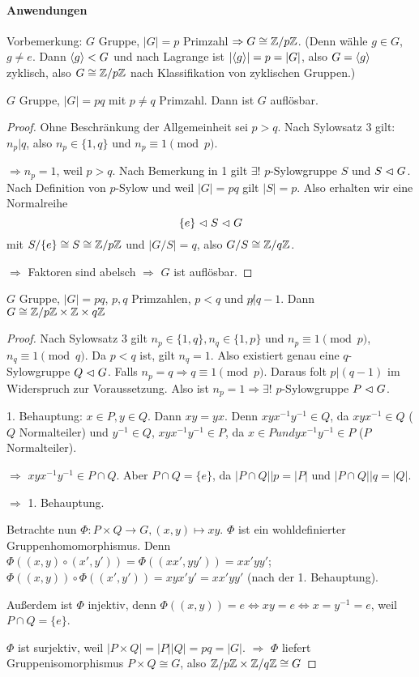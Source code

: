 \documentclass[12pt,a4paper]{scrartcl}
\begin{document}
\paragraph{Anwendungen}\leavevmode
Vorbemerkung: $G$ Gruppe, $|G| = p$ Primzahl $\Rightarrow G\cong \mathbb Z/p\mathbb Z$. (Denn wähle $g\in G$, $g\neq e$. Dann $\langle g\rangle <G$ und nach Lagrange ist $|\langle g\rangle| = p = |G|$, also $G = \langle g\rangle$ zyklisch, also $G\cong \mathbb Z/p\mathbb Z$ nach Klassifikation von zyklischen Gruppen.)
\begin{satz}
	$G$ Gruppe, $|G| = pq$ mit $p\neq q$ Primzahl. Dann ist $G$ auflösbar.
\end{satz}	
\begin{proof}
	Ohne Beschränkung der Allgemeinheit sei $p>q$. Nach Sylowsatz 3 gilt: $n_p|q$, also $n_p\in\{1,q\}$ und $n_p\equiv 1 \pmod p$.
	
	$\Rightarrow n_p = 1$, weil $p>q$. Nach Bemerkung in 1 gilt $\exists!$ $p$-Sylowgruppe $S$ und $S\vartriangleleft G$. Nach Definition von $p$-Sylow und weil $|G| = pq$ gilt $|S| = p$. Also erhalten wir eine Normalreihe 
	$$ \{e\}\vartriangleleft S\vartriangleleft G$$ mit $S/\{e\}\cong S\cong \mathbb Z/p\mathbb Z$ und $|G/S| = q$, also $G/S\cong \mathbb Z/q\mathbb Z$.
	
	$\Rightarrow$ Faktoren sind abelsch $\Rightarrow$ $G$ ist auflösbar.
\end{proof}

\begin{satz}
	$G$ Gruppe, $|G| = pq$, $p,q$ Primzahlen, $p<q$ und $p\not| q-1$. Dann $G\cong\mathbb Z/p\mathbb Z \times \mathbb Z\times q\mathbb Z$
\end{satz}
\begin{proof}
	Nach Sylowsatz 3 gilt $n_p\in \{1,q\}, n_q\in\{1,p\}$ und $n_p\equiv 1\pmod p$, $n_q\equiv 1\pmod q$. Da $p<q$ ist, gilt $n_q = 1$. Also existiert genau eine $q$-Sylowgruppe $Q\vartriangleleft G$. Falls $n_p = q\Rightarrow q\equiv 1\pmod p$. Daraus folt $p|(q-1)$ im Widerspruch zur Voraussetzung. Also ist $n_p = 1\Rightarrow \exists!$ $p$-Sylowgruppe $P\vartriangleleft G$.
	
	1. Behauptung: $x\in P ,y\in Q$. Dann $xy = yx$. Denn $xyx^{-1}y^{-1}\in Q$, da $xyx^{-1}\in Q$ ($Q$ Normalteiler) und $y^{-1}\in Q$, $xyx^{-1}y^{-1}\in P$, da $x\in P und yx^{-1}y^{-1} \in P$ ($P$ Normalteiler).
	
	$\Rightarrow$ $xyx^{-1}y^{-1} \in P\cap Q$. Aber $P\cap Q = \{e\}$, da $|P\cap Q||p = |P|$ und $|P\cap Q||q = |Q|$.
	
	$\Rightarrow$ 1. Behauptung.
	
	Betrachte nun $\Phi\colon P\times Q\to G, (x,y)\mapsto xy$. $\Phi$ ist ein wohldefinierter Gruppenhomomorphismus. Denn $\Phi((x,y)\circ (x',y')) = \Phi ((xx', yy')) = xx'yy'$; $\Phi((x,y))\circ \Phi((x',y')) = xyx'y' = xx'yy'$ (nach der 1. Behauptung).
	
	Außerdem ist $\Phi$ injektiv, denn $\Phi((x,y)) = e\Leftrightarrow xy = e\Leftrightarrow x = y^{-1} = e$, weil $P\cap Q = \{e\}$.
	
	$\Phi$ ist surjektiv, weil $|P\times Q| = |P||Q| = pq = |G|$. $\Rightarrow$ $\Phi$ liefert Gruppenisomorphismus $P\times Q \cong G$, also $\mathbb Z/p\mathbb Z\times \mathbb Z/q\mathbb Z\cong G$
\end{proof}
\end{document}
